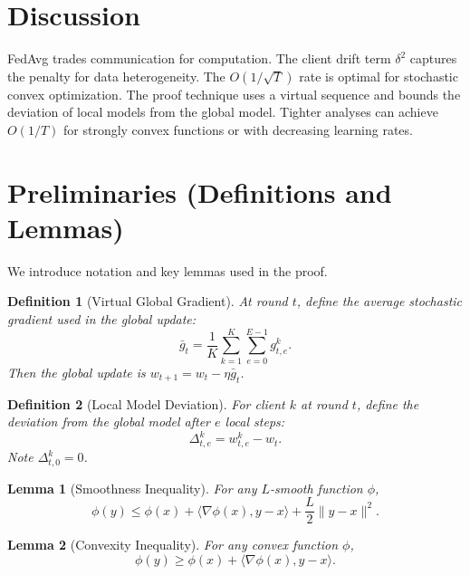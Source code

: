 \documentclass{article}
\newtheorem{lemma}{Lemma}
\newtheorem{definition}{Definition}
\begin{document}
\section*{Discussion}
FedAvg trades communication for computation. The client drift term $\delta^2$ captures the penalty for data heterogeneity. The $O(1/\sqrt{T})$ rate is optimal for stochastic convex optimization. The proof technique uses a virtual sequence and bounds the deviation of local models from the global model. Tighter analyses can achieve $O(1/T)$ for strongly convex functions or with decreasing learning rates.

\section*{Preliminaries (Definitions and Lemmas)}
We introduce notation and key lemmas used in the proof.

\begin{definition}[Virtual Global Gradient]
At round $t$, define the average stochastic gradient used in the global update:
\begin{equation}
\bar{g}_t = \frac{1}{K}\sum_{k=1}^K \sum_{e=0}^{E-1} g_{t,e}^k.
\end{equation}
Then the global update is $w_{t+1} = w_t - \eta \bar{g}_t$.
\end{definition}

\begin{definition}[Local Model Deviation]
For client $k$ at round $t$, define the deviation from the global model after $e$ local steps:
\begin{equation}
\Delta_{t,e}^k = w_{t,e}^k - w_t.
\end{equation}
Note $\Delta_{t,0}^k = 0$.
\end{definition}

\begin{lemma}[Smoothness Inequality]
For any $L$-smooth function $\phi$,
\begin{equation}
\phi(y) \le \phi(x) + \langle \nabla \phi(x), y-x \rangle + \frac{L}{2}\|y-x\|^2.
\end{equation}
\end{lemma}

\begin{lemma}[Convexity Inequality]
For any convex function $\phi$,
\begin{equation}
\phi(y) \ge \phi(x) + \langle \nabla \phi(x), y-x \rangle.
\end{equation}
\end{lemma}
\end{document}
